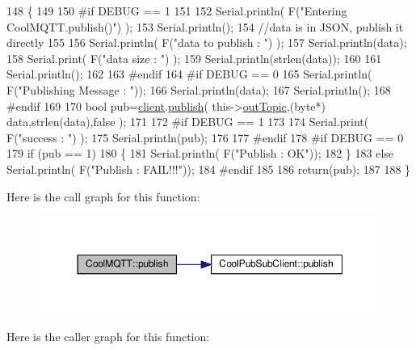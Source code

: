 \begin{DoxyCode}
148 \{
149 
150 \textcolor{preprocessor}{#if DEBUG == 1 }
151 
152     Serial.println( F(\textcolor{stringliteral}{"Entering CoolMQTT.publish()"}) );
153     Serial.println();
154     \textcolor{comment}{//data is in JSON, publish it directly}
155 
156     Serial.println( F(\textcolor{stringliteral}{"data to publish : "}) );
157     Serial.println(data);
158     Serial.print( F(\textcolor{stringliteral}{"data size : "}) );
159     Serial.println(strlen(data));
160 
161     Serial.println();
162 
163 \textcolor{preprocessor}{#endif}
164 \textcolor{preprocessor}{#if DEBUG == 0}
165     Serial.println( F(\textcolor{stringliteral}{"Publishing Message : "}));
166     Serial.println(data);
167     Serial.println();
168 \textcolor{preprocessor}{#endif}
169 
170     \textcolor{keywordtype}{bool} pub=\hyperlink{class_cool_m_q_t_t_afed1372683c44893b4668d0f1771f514}{client}.\hyperlink{class_cool_pub_sub_client_ab6ad5fa2d3db8f91454027257f225a89}{publish}( this->\hyperlink{class_cool_m_q_t_t_a109c786a17b463f9eeba046194279522}{outTopic},(byte*) data,strlen(data),\textcolor{keyword}{false}  );
171 
172 \textcolor{preprocessor}{#if DEBUG == 1 }
173 
174     Serial.print( F(\textcolor{stringliteral}{"success : "}) );
175     Serial.println(pub);    
176 
177 \textcolor{preprocessor}{#endif}
178 \textcolor{preprocessor}{#if DEBUG == 0}
179     \textcolor{keywordflow}{if} (pub == 1)
180     \{
181         Serial.println( F(\textcolor{stringliteral}{"Publish : OK"}));
182     \}
183     \textcolor{keywordflow}{else} Serial.println( F(\textcolor{stringliteral}{"Publish : FAIL!!!"}));
184 \textcolor{preprocessor}{#endif}
185 
186     \textcolor{keywordflow}{return}(pub);
187 
188 \}
\end{DoxyCode}
Here is the call graph for this function\+:\nopagebreak
\begin{figure}[H]
\begin{center}
\leavevmode
\includegraphics[width=350pt]{d0/dd0/class_cool_m_q_t_t_ace977b3e90ab14b1199fe5c4fb0a13ec_cgraph}
\end{center}
\end{figure}
Here is the caller graph for this function\+:\nopagebreak
